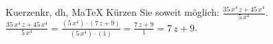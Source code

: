 \begin{MAufgabe}{Kuerzen}{kr, dh, MaTeX}
K\"urzen Sie soweit m\"oglich: $\frac{35\, x^4\, z + 45\, x^4}{5\, x^4}$.\\ 
\ifLsg\MLoesung
\quad $\frac{35\, x^4\, z + 45\, x^4}{5\, x^4}=\frac{(5\, x^4)\cdot(7\, z + 9)}{(5\, x^4)\cdot(1)}=\frac{7\, z + 9}{1}=7\, z + 9$.\else\relax\fi
 \end{MAufgabe}